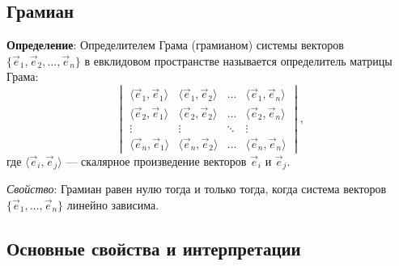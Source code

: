 \documentclass[12pt]{article}
\begin{document}
\subsection*{Грамиан}
\textbf{Определение}: Определителем Грама (грамианом) системы векторов $\{\vec{e}_1, \vec{e}_2, \dots, \vec{e}_n\}$ в евклидовом пространстве называется определитель матрицы Грама:
$$
\begin{vmatrix}
\langle \vec{e}_1, \vec{e}_1 \rangle & \langle \vec{e}_1, \vec{e}_2 \rangle & \dots & \langle \vec{e}_1, \vec{e}_n \rangle \\
\langle \vec{e}_2, \vec{e}_1 \rangle & \langle \vec{e}_2, \vec{e}_2 \rangle & \dots & \langle \vec{e}_2, \vec{e}_n \rangle \\
\vdots & \vdots & \ddots & \vdots \\
\langle \vec{e}_n, \vec{e}_1 \rangle & \langle \vec{e}_n, \vec{e}_2 \rangle & \dots & \langle \vec{e}_n, \vec{e}_n \rangle
\end{vmatrix},
$$
где $\langle \vec{e}_i, \vec{e}_j \rangle$ — скалярное произведение векторов $\vec{e}_i$ и $\vec{e}_j$.

\textit{Свойство}: Грамиан равен нулю тогда и только тогда, когда система векторов $\{\vec{e}_1, \dots, \vec{e}_n\}$ линейно зависима.

\subsection*{Основные свойства и интерпретации}
\end{document}
